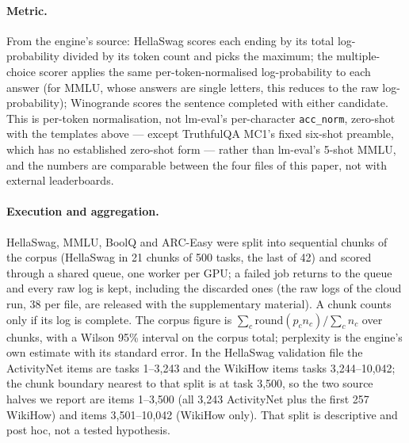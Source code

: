 \documentclass[10pt]{article} %
\begin{document}
\paragraph{Metric.} From the engine's source: HellaSwag scores each ending by
its total log-probability divided by its token count and picks the maximum;
the multiple-choice scorer applies the same per-token-normalised
log-probability to each answer (for MMLU, whose answers are single letters,
this reduces to the raw log-probability); Winogrande scores the sentence
completed with either candidate. This is per-token normalisation, not
lm-eval's per-character \texttt{acc\_norm}, zero-shot with the templates
above --- except TruthfulQA MC1's fixed six-shot preamble, which has no
established zero-shot form --- rather than lm-eval's 5-shot MMLU, and the numbers are comparable
between the four files of this paper, not with external leaderboards.

\paragraph{Execution and aggregation.} HellaSwag, MMLU, BoolQ and ARC-Easy
were split into sequential chunks of the corpus (HellaSwag in 21 chunks of 500
tasks, the last of 42) and scored through a shared queue,
one worker per GPU; a failed job returns to the queue and every raw log is
kept, including the discarded ones (the raw logs of the cloud run, 38 per
file, are released with the supplementary material). A chunk counts only if
its log is complete.
The corpus figure is $\sum_c \mathrm{round}(p_c n_c) / \sum_c n_c$ over
chunks, with a Wilson 95\% interval on the corpus total; perplexity is the
engine's own estimate with its standard error. In the HellaSwag validation
file the ActivityNet items are tasks 1--3,243 and the WikiHow items tasks
3,244--10,042; the chunk boundary nearest to that split is at task 3,500, so
the two source halves we report are items 1--3,500 (all 3,243 ActivityNet
plus the first 257 WikiHow) and items 3,501--10,042 (WikiHow only). That
split is descriptive and post hoc, not a tested hypothesis.
\end{document}

